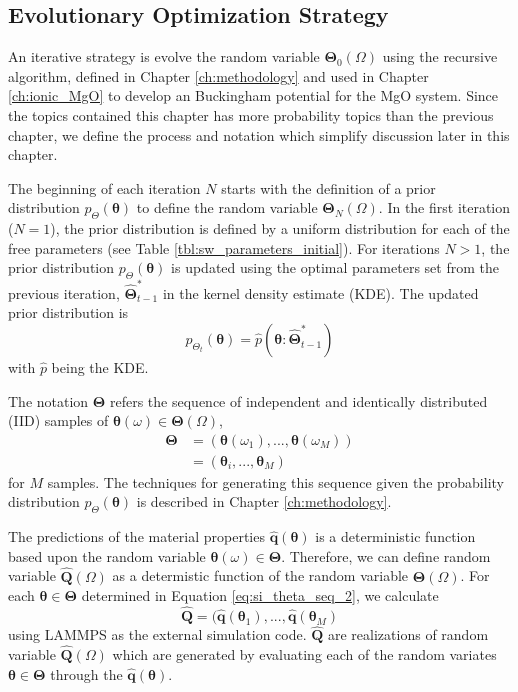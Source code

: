\subsection{Evolutionary Optimization Strategy}

An iterative strategy is evolve the random variable $\bm{\Theta}_0(\Omega)$ using the recursive algorithm, defined in Chapter \ref{ch:methodology} and used in Chapter \ref{ch:ionic_MgO} to develop an Buckingham potential for the MgO system.  Since the topics contained this chapter has more probability topics than the previous chapter, we define the process and notation which simplify discussion later in this chapter.

The beginning of each iteration $N$ starts with the definition of a prior distribution $p_{\Theta}(\bm{\theta})$ to define the random variable $\bm{\Theta}_{N}(\Omega)$.  In the first iteration ($N=1$), the prior distribution is defined by a uniform distribution for each of the free parameters (see Table \ref{tbl:sw_parameters_initial}).  For iterations $N>1$, the prior distribution
$p_{\Theta}(\bm{\theta})$ is updated using the optimal parameters set from the previous iteration, $\hat{\bm{\Theta}}_{t-1}^*$ in the kernel density estimate (KDE)\cite{rosenblatt1956_kde,parzen1962_kde}.  The updated prior distribution is
\begin{equation}
  \label{eq:si_updated_prior}
  p_{\Theta_{t}}(\bm{\theta})
  =
  \hat{p} (\bm{\theta}:\hat{\bm{\Theta}}_{t-1}^*)
\end{equation}
with $\hat{p}$ being the KDE.

The notation $\bm{\Theta}$ refers the sequence of independent and identically distributed (IID) samples of $\bm{\theta}(\omega) \in \bm{\Theta}(\Omega)$,
\begin{subequations}
  \begin{align}
     \bm{\Theta}
       &= (\bm{\theta}(\omega_1), ...,\bm{\theta}(\omega_M))
	  \label{eq:si_theta_seq_1} \\
       &= (\bm{\theta}_i,...,\bm{\theta}_M)
	  \label{eq:si_theta_seq_2}
  \end{align}
\end{subequations}
for $M$ samples. The techniques for generating this sequence given the probability distribution $p_\Theta(\bm{\theta})$ is described in Chapter \ref{ch:methodology}.

The predictions of the material properties $\hat{\bm{q}}(\bm{\theta})$ is a deterministic function based upon the random variable $\bm{\theta}(\omega) \in \bm{\Theta}$.  Therefore, we can define random variable $\hat{\bm{Q}}(\Omega)$ as a determistic function of the random variable $\bm{\Theta}(\Omega)$.  For each $\bm{\theta} \in \bm{\Theta}$ determined in Equation \ref{eq:si_theta_seq_2}, we calculate
\begin{equation}
  \hat{\bm{Q}} = (\hat{\bm{q}}(\bm{\theta}_1),...,\hat{\bm{q}}(\bm{\theta}_M)
\end{equation}
using LAMMPS\cite{plimpton1995_lammps} as the external simulation code.  $\hat{\bm{Q}}$ are realizations of random variable $\hat{\bm{Q}}(\Omega)$ which are generated by evaluating each of the random variates $\bm{\theta} \in \bm{\Theta}$ through the $\hat{\bm{q}}(\bm{\theta})$.


